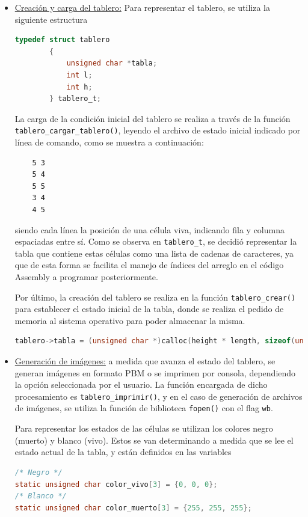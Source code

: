 \documentclass[a4paper,12pt]{article}
\numberwithin{equation}{section}
\numberwithin{figure}{section}
\begin{document}
\begin{itemize}
	\item \underline{Creación y carga del tablero:}
	Para representar el tablero, se utiliza la siguiente estructura
	\begin{lstlisting}[language=C, style=StyleC]
		typedef struct tablero
        {
        	unsigned char *tabla;
        	int l;
        	int h;
        } tablero_t;
	\end{lstlisting}
	
	La carga de la condición inicial del tablero se realiza a través de la función\\ \texttt{tablero\_cargar\_tablero()}, leyendo el archivo de estado inicial indicado por línea de comando, como se muestra a continuación:
	\begin{verbatim}
    5 3
    5 4
    5 5
    3 4
    4 5
    \end{verbatim}
	siendo cada línea la posición de una célula viva, indicando fila y columna espaciadas entre sí.
	Como se observa en \texttt{tablero\_t}, se decidió representar la tabla que contiene estas células como una lista de cadenas de caracteres, ya que de esta forma se facilita el manejo de índices del arreglo en el código Assembly a programar posteriormente.
	
	Por último, la creación del tablero se realiza en la función \texttt{tablero\_crear()} para establecer el estado inicial de la tabla, donde se realiza el pedido de memoria al sistema operativo para poder almacenar la misma.
	\begin{lstlisting}[language=C, style=StyleC]
    tablero->tabla = (unsigned char *)calloc(height * length, sizeof(unsigned char));
	\end{lstlisting}
	
	\item \underline{Generación de imágenes:} a medida que avanza el estado del tablero, se generan imágenes en formato PBM o se imprimen por consola, dependiendo la opción seleccionada por el usuario. La función encargada de dicho procesamiento es \texttt{tablero\_imprimir()}, y en el caso de generación de archivos de imágenes, se utiliza la función de biblioteca \texttt{fopen()} con el flag \texttt{wb}. 
	
	Para representar los estados de las células se utilizan los colores negro (muerto) y blanco (vivo). Estos se van determinando a medida que se lee el estado actual de la tabla, y están definidos en las variables
	\begin{lstlisting}[language=C, style=StyleC]
/* Negro */
static unsigned char color_vivo[3] = {0, 0, 0};
/* Blanco */
static unsigned char color_muerto[3] = {255, 255, 255};
	\end{lstlisting}
	

\end{itemize}
\end{document}
